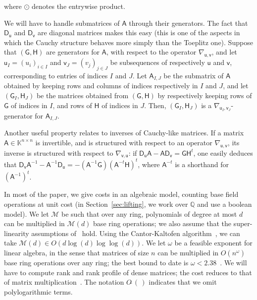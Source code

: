 \documentclass[sigconf]{acmart}
\newcommand{\vu}{\ensuremath{\mathsf{u}}}
\newcommand{\vv}{\ensuremath{\mathsf{v}}}
\newcommand{\mA}{\ensuremath{\mathsf{A}}}
\newcommand{\mD}{\ensuremath{\mathsf{D}}}
\newcommand{\mG}{\ensuremath{\mathsf{G}}}
\newcommand{\mH}{\ensuremath{\mathsf{H}}}
\newcommand{\K}{\ensuremath{\mathbb{K}}}
\newcommand{\Q}{\ensuremath{\mathbb{Q}}}
\newcommand{\M}{\ensuremath{\mathscr{M}}}
\newcommand{\Otilde}[1]{\ensuremath{O\tilde{~}(#1)}} %
\theoremstyle{acmdefinition}
\begin{document}
\vspace{-7px}
{\noindent}where $\odot$ denotes the entrywise product.

We will have to handle submatrices of $\mA$ through their
generators. The fact that $\mD_{\vu}$ and $\mD_{\vv}$ are diagonal
matrices makes this easy (this is one of the aspects in which the
Cauchy structure behaves more simply than the Toeplitz one).  Suppose
that $(\mG,\mH)$ are generators for $\mA$, with respect to the
operator $\nabla_{\vu,\vv}$, and let $\vu_I=(u_i)_{i \in I}$ and
$\vv_J=(v_j)_{j \in J}$ be subsequences of respectively $\vu$ and
$\vv$, corresponding to entries of indices $I$ and $J$. Let
$\mA_{I,J}$ be the submatrix of $\mA$ obtained by keeping rows and
columns of indices respectively in $I$ and $J$, and let
$(\mG_I,\mH_J)$ be the matrices obtained from $(\mG,\mH)$ by
respectively keeping rows of $\mG$ of indices in $I$, and rows of
$\mH$ of indices in $J$. Then, $(\mG_I,\mH_J)$ is a
$\nabla_{\vu_I,\vv_J}$-generator for $\mA_{I,J}$.

Another useful property relates to inverses of Cauchy-like matrices.
If a matrix $\mA \in \K^{n\times n}$ is invertible, and is structured
with respect to an operator $\nabla_{\vu,\vv}$, its inverse is
structured with respect to $\nabla_{\vv,\vu}$: if $\mD_\vu \mA - \mA
\mD_\vv = \mG \mH^t$, one easily deduces that $\mD_\vv \mA^{-1} -
\mA^{-1} \mD_\vu = - (\mA^{-1} \mG) (\mA^{-t} \mH)^t$, where $\mA^{-t}$
is a shorthand for $(\mA^{-1})^t$.

{}  In most of the paper, we
give costs in an algebraic model, counting base field operations at
unit cost (in Section~\ref{sec:lifting}, we work over $\Q$ and use 
a boolean model).
%
We let $\M$ be such that over any ring, polynomials of degree at most
$d$ can be multiplied in $\M(d)$ base ring operations; we also assume
that the super-linearity assumptions of~\cite[Chapter~8]{GaGe13}
hold. Using the Cantor-Kaltofen algorithm~\cite{CaKa91}, we can take
$\M(d)\in O(d \log(d)\log\log(d))$. We let $\omega$ be a feasible
exponent for linear algebra, in the sense that matrices of size $n$
can be multiplied in $O(n^\omega)$ base ring operations over any ring;
the best bound to date is $\omega < 2.38$~\cite{CoWi90, LeGall14}.  We
will have to compute rank and rank profile of dense matrices; the cost
reduces to that of matrix multiplication~\cite{IbMoHu82}. The notation
$\Otilde{\,}$ indicates that we omit polylogarithmic terms.
\end{document}
